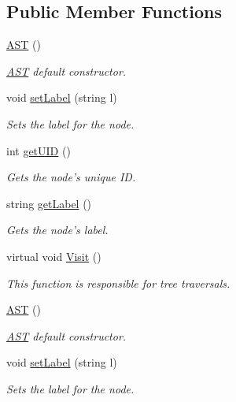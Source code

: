 \subsection*{Public Member Functions}
\begin{DoxyCompactItemize}
\item 
\hyperlink{classAST_afd378ca7cb3049d6293e8597d31d758d}{A\-S\-T} ()
\begin{DoxyCompactList}\small\item\em \hyperlink{classAST}{A\-S\-T} default constructor. \end{DoxyCompactList}\item 
void \hyperlink{classAST_a71d680856e95ff89f55d5311a552eba6}{set\-Label} (string l)
\begin{DoxyCompactList}\small\item\em Sets the label for the node. \end{DoxyCompactList}\item 
int \hyperlink{classAST_ab7a5b1d9f1c2de0d98deb356f724a42c}{get\-U\-I\-D} ()
\begin{DoxyCompactList}\small\item\em Gets the node's unique I\-D. \end{DoxyCompactList}\item 
string \hyperlink{classAST_aee029be902fffc927d16ccb03eb922ad}{get\-Label} ()
\begin{DoxyCompactList}\small\item\em Gets the node's label. \end{DoxyCompactList}\item 
virtual void \hyperlink{classAST_a5828cc86f2c4f1a0aeab6d7069e8fd82}{Visit} ()
\begin{DoxyCompactList}\small\item\em This function is responsible for tree traversals. \end{DoxyCompactList}\item 
\hyperlink{classAST_afd378ca7cb3049d6293e8597d31d758d}{A\-S\-T} ()
\begin{DoxyCompactList}\small\item\em \hyperlink{classAST}{A\-S\-T} default constructor. \end{DoxyCompactList}\item 
void \hyperlink{classAST_a71d680856e95ff89f55d5311a552eba6}{set\-Label} (string l)
\begin{DoxyCompactList}\small\item\em Sets the label for the node. \end{DoxyCompactList}\item 

\end{DoxyCompactItemize}
